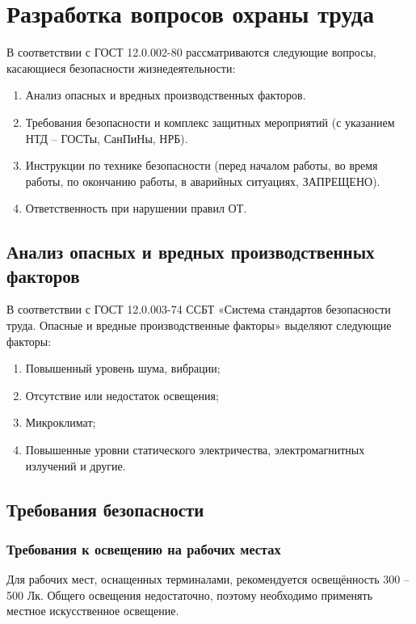 \newpage
{}
\section{Разработка вопросов охраны труда}
\setcounter{table}{0}

В соответствии с ГОСТ 12.0.002-80 рассматриваются следующие вопросы, касающиеся безопасности жизнедеятельности:

\begin{enumerate}
 \item Анализ опасных и вредных производственных факторов.
 \item Требования безопасности и комплекс защитных мероприятий (с указанием НТД – ГОСТы, СанПиНы, НРБ).
 \item Инструкции по технике безопасности (перед началом работы, во время работы, по окончанию работы, в аварийных ситуациях, ЗАПРЕЩЕНО).
 \item Ответственность при нарушении правил ОТ. 
\end{enumerate}

\subsection{Анализ опасных и вредных производственных факторов}

В соответствии с ГОСТ 12.0.003-74 ССБТ «Система стандартов безопасности труда. Опасные и вредные производственные факторы» выделяют следующие факторы:

\begin{enumerate}
 \item Повышенный уровень шума, вибрации;
 \item Отсутствие или недостаток освещения;
 \item Микроклимат;
 \item Повышенные уровни статического электричества, электромагнитных излучений и другие.
\end{enumerate}

\subsection{Требования безопасности}

\subsubsection{Требования к освещению на рабочих местах}

Для рабочих мест, оснащенных терминалами, рекомендуется освещённость 300 – 500 Лк. Общего освещения недостаточно, поэтому необходимо применять местное искусственное освещение.

